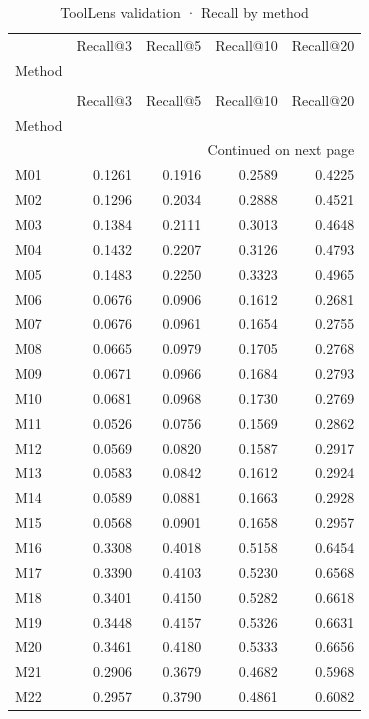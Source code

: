 \begin{longtable}{lrrrr}
\caption{ToolLens validation · Recall by method} \label{tab:ToolLens-validation-validation-family-recall} \\
\toprule
 & Recall@3 & Recall@5 & Recall@10 & Recall@20 \\
Method &  &  &  &  \\
\midrule
\endfirsthead
\caption[]{ToolLens validation · Recall by method} \\
\toprule
 & Recall@3 & Recall@5 & Recall@10 & Recall@20 \\
Method &  &  &  &  \\
\midrule
\endhead
\midrule
\multicolumn{5}{r}{Continued on next page} \\
\midrule
\endfoot
\bottomrule
\endlastfoot
M01 & 0.1261 & 0.1916 & 0.2589 & 0.4225 \\
M02 & 0.1296 & 0.2034 & 0.2888 & 0.4521 \\
M03 & 0.1384 & 0.2111 & 0.3013 & 0.4648 \\
M04 & 0.1432 & 0.2207 & 0.3126 & 0.4793 \\
M05 & 0.1483 & 0.2250 & 0.3323 & 0.4965 \\
M06 & 0.0676 & 0.0906 & 0.1612 & 0.2681 \\
M07 & 0.0676 & 0.0961 & 0.1654 & 0.2755 \\
M08 & 0.0665 & 0.0979 & 0.1705 & 0.2768 \\
M09 & 0.0671 & 0.0966 & 0.1684 & 0.2793 \\
M10 & 0.0681 & 0.0968 & 0.1730 & 0.2769 \\
M11 & 0.0526 & 0.0756 & 0.1569 & 0.2862 \\
M12 & 0.0569 & 0.0820 & 0.1587 & 0.2917 \\
M13 & 0.0583 & 0.0842 & 0.1612 & 0.2924 \\
M14 & 0.0589 & 0.0881 & 0.1663 & 0.2928 \\
M15 & 0.0568 & 0.0901 & 0.1658 & 0.2957 \\
M16 & 0.3308 & 0.4018 & 0.5158 & 0.6454 \\
M17 & 0.3390 & 0.4103 & 0.5230 & 0.6568 \\
M18 & 0.3401 & 0.4150 & 0.5282 & 0.6618 \\
M19 & 0.3448 & 0.4157 & 0.5326 & 0.6631 \\
M20 & 0.3461 & 0.4180 & 0.5333 & 0.6656 \\
M21 & 0.2906 & 0.3679 & 0.4682 & 0.5968 \\
M22 & 0.2957 & 0.3790 & 0.4861 & 0.6082 \\

\end{longtable}
